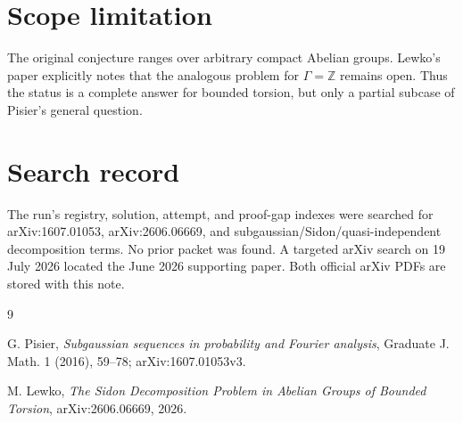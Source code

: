 \documentclass[11pt]{article}
\begin{document}
\section*{Scope limitation}

The original conjecture ranges over arbitrary compact Abelian groups.
Lewko's paper explicitly notes that the analogous problem for
$\Gamma=\mathbb Z$ remains open.  Thus the status is a complete answer for
bounded torsion, but only a partial subcase of Pisier's general question.

\section*{Search record}

The run's registry, solution, attempt, and proof-gap indexes were searched for
arXiv:1607.01053, arXiv:2606.06669, and subgaussian/Sidon/quasi-independent
decomposition terms.  No prior packet was found.  A targeted arXiv search on
19 July 2026 located the June 2026 supporting paper.  Both official arXiv PDFs
are stored with this note.

\begin{thebibliography}{9}

G. Pisier,
\emph{Subgaussian sequences in probability and Fourier analysis},
Graduate J. Math. 1 (2016), 59--78; arXiv:1607.01053v3.

M. Lewko,
\emph{The Sidon Decomposition Problem in Abelian Groups of Bounded Torsion},
arXiv:2606.06669, 2026.

\end{thebibliography}
\end{document}
